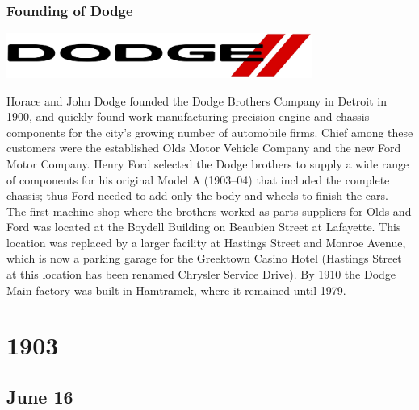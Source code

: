 \documentclass[11pt]{report}
\begin{document}
\subsection{Founding of Dodge}
\vspace{2mm}\begin{center}\includegraphics[width=10cm]{./img/dodgeLogo.jpg}\end{center}
Horace and John Dodge founded the Dodge Brothers Company in Detroit in 1900, and quickly found work manufacturing precision engine and chassis components for the city's growing number of automobile firms. Chief among these customers were the established Olds Motor Vehicle Company and the new Ford Motor Company. Henry Ford selected the Dodge brothers to supply a wide range of components for his original Model A (1903–04) that included the complete chassis; thus Ford needed to add only the body and wheels to finish the cars.\\ \indent The first machine shop where the brothers worked as parts suppliers for Olds and Ford was located at the Boydell Building on Beaubien Street at Lafayette. This location was replaced by a larger facility at Hastings Street and Monroe Avenue, which is now a parking garage for the Greektown Casino Hotel (Hastings Street at this location has been renamed Chrysler Service Drive). By 1910 the Dodge Main factory was built in Hamtramck, where it remained until 1979.

\chapter{1903}
\section{June 16}
\end{document}
